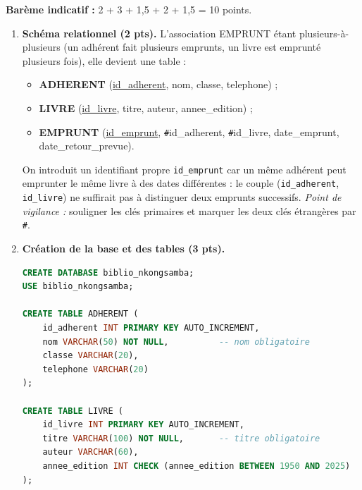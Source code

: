 \documentclass[11pt]{article}
\begin{document}
\begin{corrige}
\textbf{Barème indicatif :} 2 + 3 + 1,5 + 2 + 1,5 = 10 points.
\begin{enumerate}
\item \textbf{Schéma relationnel (2 pts).} L'association EMPRUNT étant plusieurs-à-plusieurs (un adhérent fait plusieurs emprunts, un livre est emprunté plusieurs fois), elle devient une table :
\begin{itemize}
\item \textbf{ADHERENT} (\underline{id\_adherent}, nom, classe, telephone) ;
\item \textbf{LIVRE} (\underline{id\_livre}, titre, auteur, annee\_edition) ;
\item \textbf{EMPRUNT} (\underline{id\_emprunt}, \texttt{\#}id\_adherent, \texttt{\#}id\_livre, date\_emprunt, date\_retour\_prevue).
\end{itemize}
On introduit un identifiant propre \texttt{id\_emprunt} car un même adhérent peut emprunter le même livre à des dates différentes : le couple (\texttt{id\_adherent}, \texttt{id\_livre}) ne suffirait pas à distinguer deux emprunts successifs. \emph{Point de vigilance :} souligner les clés primaires et marquer les deux clés étrangères par \texttt{\#}.
\item \textbf{Création de la base et des tables (3 pts).}
\begin{lstlisting}[language=SQL]
CREATE DATABASE biblio_nkongsamba;
USE biblio_nkongsamba;

CREATE TABLE ADHERENT (
    id_adherent INT PRIMARY KEY AUTO_INCREMENT,
    nom VARCHAR(50) NOT NULL,          -- nom obligatoire
    classe VARCHAR(20),
    telephone VARCHAR(20)
);

CREATE TABLE LIVRE (
    id_livre INT PRIMARY KEY AUTO_INCREMENT,
    titre VARCHAR(100) NOT NULL,       -- titre obligatoire
    auteur VARCHAR(60),
    annee_edition INT CHECK (annee_edition BETWEEN 1950 AND 2025)
);


\end{lstlisting}
\end{enumerate}
\end{corrige}
\end{document}
